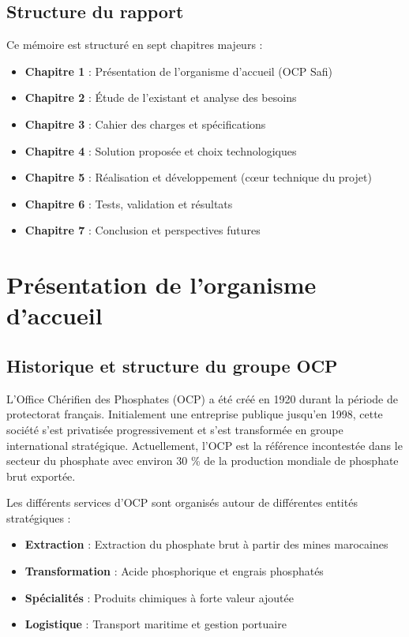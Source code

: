 \documentclass[a4paper,12pt,twoside]{report}
\begin{document}
\section*{Structure du rapport}

Ce mémoire est structuré en sept chapitres majeurs :

\begin{itemize}
    \item \textbf{Chapitre 1} : Présentation de l'organisme d'accueil (OCP Safi)
    \item \textbf{Chapitre 2} : Étude de l'existant et analyse des besoins
    \item \textbf{Chapitre 3} : Cahier des charges et spécifications
    \item \textbf{Chapitre 4} : Solution proposée et choix technologiques
    \item \textbf{Chapitre 5} : Réalisation et développement (cœur technique du projet)
    \item \textbf{Chapitre 6} : Tests, validation et résultats
    \item \textbf{Chapitre 7} : Conclusion et perspectives futures
\end{itemize}

\chapter{Présentation de l'organisme d'accueil}

\section{Historique et structure du groupe OCP}

L’Office Chérifien des Phosphates (OCP) a été créé en 1920 durant la période de protectorat français. Initialement une entreprise publique jusqu’en 1998, cette société s’est privatisée progressivement et s’est transformée en groupe international stratégique. Actuellement, l'OCP est la référence incontestée dans le secteur du phosphate avec environ 30 \% de la production mondiale de phosphate brut exportée.

Les différents services d’OCP sont organisés autour de différentes entités stratégiques :
\begin{itemize}
    \item \textbf{Extraction} : Extraction du phosphate brut à partir des mines marocaines
    \item \textbf{Transformation} : Acide phosphorique et engrais phosphatés
    \item \textbf{Spécialités} : Produits chimiques à forte valeur ajoutée
    \item \textbf{Logistique} : Transport maritime et gestion portuaire
\end{itemize}
\end{document}
